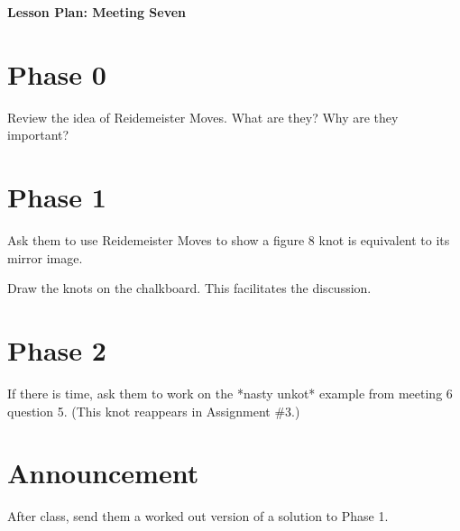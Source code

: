 \documentclass[12pt]{amsart}
\theoremstyle{definition}
\begin{document}
\begin{center}
\textbf{\Huge
Lesson Plan: Meeting Seven
}
\end{center}
\vspace{.5in}

\section*{Phase 0}

Review the idea of Reidemeister Moves. What are they? Why are they important? 

\section*{Phase 1}
Ask them to use Reidemeister Moves to show a figure 8 knot is equivalent to its mirror image.

Draw the knots on the chalkboard. This facilitates the discussion.

\section*{Phase 2}
If there is time, ask them to work on the *nasty unkot* example from meeting 6 question 5. (This knot reappears in Assignment \#3.)

\section*{Announcement}
After class, send them a worked out version of a solution to Phase 1.
\end{document}
